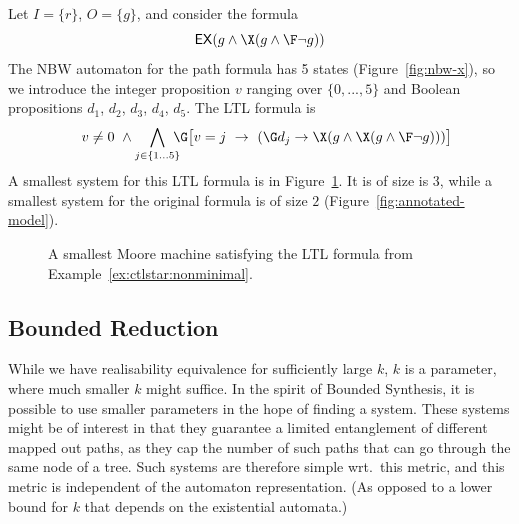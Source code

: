 \begin{example}\label{ex:ctlstar:nonminimal}
Let $I = \{r\}$, $O=\{g\}$,
and consider the \CTLstar formula
$$
\EX(g \land \X(g \land \F\neg g))
$$
The NBW automaton for the path formula has 5 states (Figure~\ref{fig:nbw-x}),
so we introduce the integer proposition $v$ ranging over $\{0,...,5\}$
and Boolean propositions $d_1$, $d_2$, $d_3$, $d_4$, $d_5$.
The LTL formula is
$$
~~~v \neq 0 ~\land
\bigwedge_{j \in \{1...5\}}\!\!\!\!
\G\big[v=j ~\impl~ (\G d_j \impl \X(g \land \X(g \land \F\neg g)))\big]
$$
A smallest system for this LTL formula is in Figure~\ref{fig:ctlstar:nonminimal:system:ltl}.
It is of size is $3$,
while a smallest system for the original \CTLstar formula is of size $2$
(Figure~\ref{fig:annotated-model}).
\begin{figure}[tb]\center
{}
\caption{%
  A smallest Moore machine satisfying the LTL formula from Example~\ref{ex:ctlstar:nonminimal}.}
\label{fig:ctlstar:nonminimal:system:ltl}
\end{figure}
\end{example}


\subsection{Bounded Reduction}

While we have realisability equivalence for sufficiently large $k$, $k$ is a parameter,
where much smaller $k$ might suffice.
In the spirit of Bounded Synthesis,
it is possible to use smaller parameters in the hope of finding a system.
These systems might be of interest in that they guarantee a limited entanglement of different mapped out paths,
as they cap the number of such paths that can go through the same node of a tree.
Such systems are therefore simple wrt.\ this metric,
and this metric is independent of the automaton representation.
(As opposed to a lower bound for $k$
 that depends on the existential automata.)

